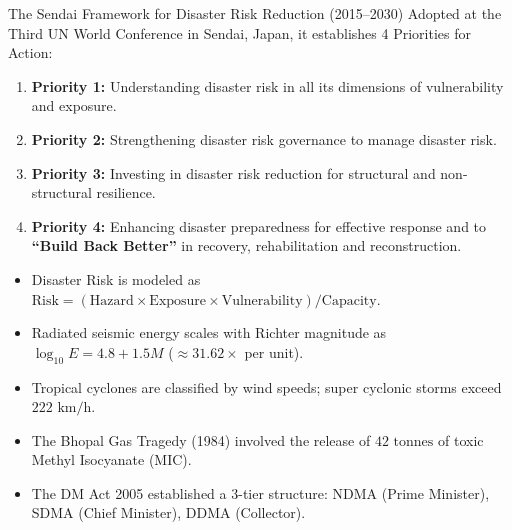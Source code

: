 \begin{lawbox}{The Sendai Framework for Disaster Risk Reduction (2015--2030)}
Adopted at the Third UN World Conference in Sendai, Japan, it establishes 4 Priorities for Action:
\begin{enumerate}[leftmargin=1.2em]
    \item \textbf{Priority 1:} Understanding disaster risk in all its dimensions of vulnerability and exposure.
    \item \textbf{Priority 2:} Strengthening disaster risk governance to manage disaster risk.
    \item \textbf{Priority 3:} Investing in disaster risk reduction for structural and non-structural resilience.
    \item \textbf{Priority 4:} Enhancing disaster preparedness for effective response and to \textbf{``Build Back Better''} in recovery, rehabilitation and reconstruction.
\end{enumerate}
\end{lawbox}

\begin{quickrevision}
\begin{itemize}[leftmargin=1.2em]
    \item Disaster Risk is modeled as $\text{Risk} = (\text{Hazard} \times \text{Exposure} \times \text{Vulnerability}) / \text{Capacity}$.
    \item Radiated seismic energy scales with Richter magnitude as $\log_{10} E = 4.8 + 1.5 M$ ($\approx 31.62\times$ per unit).
    \item Tropical cyclones are classified by wind speeds; super cyclonic storms exceed $222\text{ km/h}$.
    \item The Bhopal Gas Tragedy (1984) involved the release of $42\text{ tonnes}$ of toxic Methyl Isocyanate (MIC).
    \item The DM Act 2005 established a 3-tier structure: NDMA (Prime Minister), SDMA (Chief Minister), DDMA (Collector).
\end{itemize}
\end{quickrevision}
